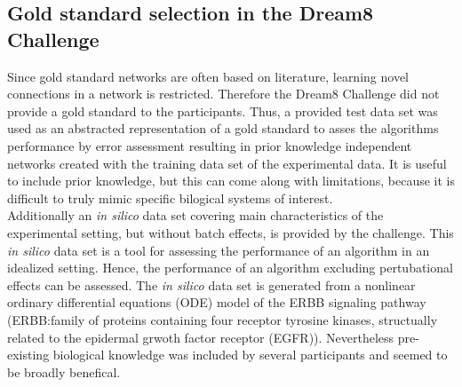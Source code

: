 \subsection*{Gold standard selection in the Dream8 Challenge}
Since gold standard networks are often based on literature, learning novel connections in a network is restricted. Therefore the Dream8 Challenge did not provide a gold standard to the participants. Thus, a provided test data set was used as an abstracted representation of a gold standard to asses the algorithms performance by error assessment resulting in prior knowledge independent networks created with the training data set of the experimental data. It is useful to include prior knowledge, but this can come along with limitations, because it is difficult to truly mimic specific bilogical systems of interest.\\
Additionally an \textit{in silico} data set covering main characteristics of the experimental setting, but without batch effects, is provided by the challenge. This \textit{in silico} data set is a tool for assessing the performance of an algorithm in an idealized setting. Hence, the performance of an algorithm excluding pertubational effects can be assessed.
The \textit{in silico} data set is generated from a nonlinear ordinary differential equations (ODE) model of the ERBB signaling pathway (ERBB:family of proteins containing four receptor tyrosine kinases, structually related to the epidermal grwoth factor receptor (EGFR)). Nevertheless pre-existing biological knowledge was included by several participants and seemed to be broadly benefical.\\

